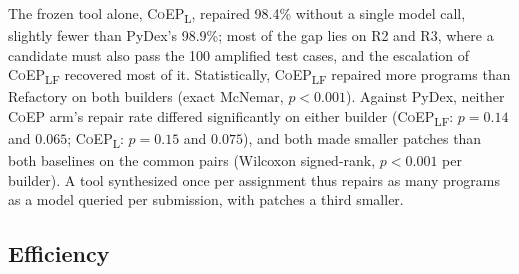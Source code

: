 \documentclass[acmsmall,screen,review,anonymous,nonacm]{acmart}
\newcommand{\tool}{\textsc{CoEP}\xspace}
\newcommand{\coepL}{\textsc{CoEP}\textsubscript{L}\xspace}
\newcommand{\coepLF}{\textsc{CoEP}\textsubscript{LF}\xspace}
\begin{document}
The frozen tool alone, \coepL, repaired 98.4\% without a single model call, slightly fewer than PyDex's 98.9\%; most of the gap lies on R2 and R3, where a candidate must also pass the 100 amplified test cases, and the escalation of \coepLF recovered most of it. Statistically, \coepLF repaired more programs than Refactory on both builders (exact McNemar, $p < 0.001$). Against PyDex, neither \tool arm's repair rate differed significantly on either builder (\coepLF: $p = 0.14$ and $0.065$; \coepL: $p = 0.15$ and $0.075$), and both made smaller patches than both baselines on the common pairs (Wilcoxon signed-rank, $p < 0.001$ per builder). A tool synthesized once per assignment thus repairs as many programs as a model queried per submission, with patches a third smaller.

\subsection{Efficiency}
\label{sec:rq-cost}
\end{document}
